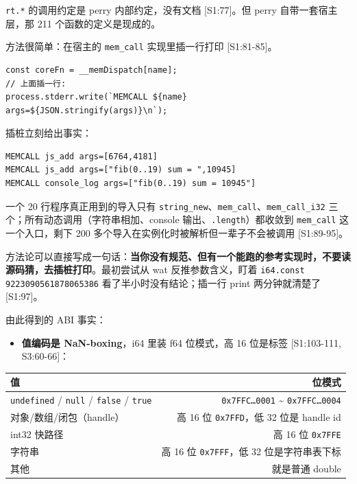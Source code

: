\documentclass[11pt, a4paper]{article}
\begin{document}
\texttt{rt.*} 的调用约定是 perry 内部约定，没有文档 [S1:77]。但 perry 自带一套宿主层，那 211 个函数的定义是现成的。


方法很简单：在宿主的 \texttt{mem\_call} 实现里插一行打印 [S1:81-85]。


\begin{verbatim}
const coreFn = __memDispatch[name];
// 上面插一行:
process.stderr.write(`MEMCALL ${name} args=${JSON.stringify(args)}\n`);
\end{verbatim}

插桩立刻给出事实：


\begin{verbatim}
MEMCALL js_add args=[6764,4181]
MEMCALL js_add args=["fib(0..19) sum = ",10945]
MEMCALL console_log args=["fib(0..19) sum = 10945"]
\end{verbatim}

一个 20 行程序真正用到的导入只有 \texttt{string\_new}、\texttt{mem\_call}、\texttt{mem\_call\_i32} 三个；所有动态调用（字符串相加、console 输出、\texttt{.length}）都收敛到 \texttt{mem\_call} 这一个入口，剩下 200 多个导入在实例化时被解析但一辈子不会被调用 [S1:89-95]。


方法论可以直接写成一句话：\textbf{当你没有规范、但有一个能跑的参考实现时，不要读源码猜，去插桩打印}。最初尝试从 wat 反推参数含义，盯着 \texttt{i64.const 9223090561878065386} 看了半小时没有结论；插一行 print 两分钟就清楚了 [S1:97]。


由此得到的 ABI 事实：


\begin{itemize}
\item \textbf{值编码是 NaN-boxing}，i64 里装 f64 位模式，高 16 位是标签 [S1:103-111, S3:60-66]：
\end{itemize}

\begin{center}\small\begin{tabular}{lr}
\toprule
值 & 位模式 \\
\midrule
\texttt{undefined} / \texttt{null} / \texttt{false} / \texttt{true} & \texttt{0x7FFC…0001} \textasciitilde{} \texttt{0x7FFC…0004} \\
对象/数组/闭包（handle） & 高 16 位 \texttt{0x7FFD}，低 32 位是 handle id \\
int32 快路径 & 高 16 位 \texttt{0x7FFE} \\
字符串 & 高 16 位 \texttt{0x7FFF}，低 32 位是字符串表下标 \\
其他 & 就是普通 double \\
\bottomrule
\end{tabular}\end{center}
\end{document}
